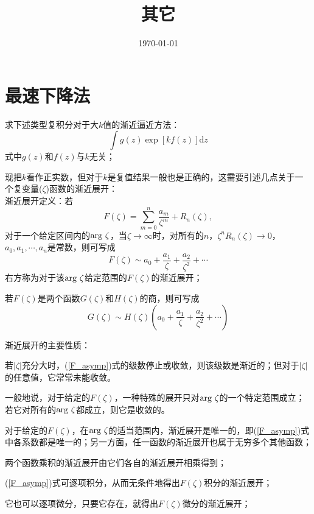 \documentclass[11pt,a4paper]{article}
\title{其它}
\author{}
\date{\today}
\newcommand{\dif}{\mathrm{d}}
\begin{document}
\maketitle

\section{最速下降法}
求下述类型复积分对于大$k$值的渐近逼近方法：
\begin{equation}
\int g(z) \exp[k f(z)] \dif z
\label{integ}
\end{equation}
式中$g(z)$和$f(z)$与$k$无关；

现把$k$看作正实数，但对于$k$是复值结果一般也是正确的，这需要引述几点关于一个复变量($\zeta$)函数的渐近展开：\\
渐近展开定义：若
\begin{equation}
F(\zeta) = \sum_{m=0}^{n} \frac{a_m}{\zeta^m} +R_n(\zeta) ,
\end{equation}
对于一个给定区间内的${\rm arg}~ \zeta$，当$\zeta \rightarrow \infty$时，对所有的$n$，$\zeta^n R_n(\zeta) \rightarrow 0$，$a_0, a_1, \cdots, a_n$是常数，则可写成
\begin{equation}
F(\zeta) \sim a_0 + \frac{a_1}{\zeta} +\frac{a_2}{\zeta^2} +\cdots
\label{F_asymp}
\end{equation}
右方称为对于该${\rm arg}~ \zeta$给定范围的$F(\zeta)$的渐近展开；

若$F(\zeta)$是两个函数$G(\zeta)$和$H(\zeta)$的商，则可写成
\begin{equation}
G(\zeta) \sim H(\zeta)\left( a_0 + \frac{a_1}{\zeta} +\frac{a_2}{\zeta^2} +\cdots \right)
\end{equation}

渐近展开的主要性质：

若$|\zeta|$充分大时，(\ref{F_asymp})式的级数停止或收敛，则该级数是渐近的；但对于$|\zeta|$的任意值，它常常未能收敛。

一般地说，对于给定的$F(\zeta)$，一种特殊的展开只对${\rm arg}~ \zeta$的一个特定范围成立；若它对所有的${\rm arg}~ \zeta$都成立，则它是收敛的。

对于给定的$F(\zeta)$，在${\rm arg}~ \zeta$的适当范围内，渐近展开是唯一的，即(\ref{F_asymp})式中各系数都是唯一的；另一方面，任一函数的渐近展开也属于无穷多个其他函数；

两个函数乘积的渐近展开由它们各自的渐近展开相乘得到；

(\ref{F_asymp})式可逐项积分，从而无条件地得出$F(\zeta)$积分的渐近展开；

它也可以逐项微分，只要它存在，就得出$F(\zeta)$微分的渐近展开；
\end{document}

